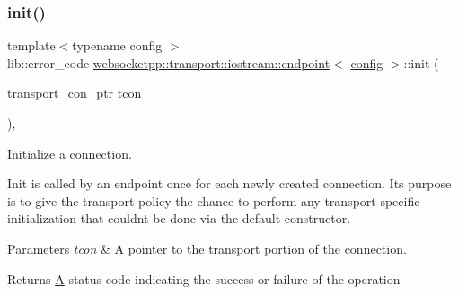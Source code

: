 \subsubsection{\texorpdfstring{init()}{init()}}
{\footnotesize\ttfamily template$<$typename config $>$ \\
lib\+::error\+\_\+code \mbox{\hyperlink{classwebsocketpp_1_1transport_1_1iostream_1_1endpoint}{websocketpp\+::transport\+::iostream\+::endpoint}}$<$ \mbox{\hyperlink{classconfig}{config}} $>$\+::init (\begin{DoxyParamCaption}\item[{\mbox{\hyperlink{classwebsocketpp_1_1transport_1_1iostream_1_1endpoint_a709bba4a4e1e2b7829abe4aa55de8078}{transport\+\_\+con\+\_\+ptr}}}]{tcon }\end{DoxyParamCaption})\hspace{0.3cm}{\ttfamily [inline]}, {\ttfamily [protected]}}



Initialize a connection. 

Init is called by an endpoint once for each newly created connection. It\textquotesingle{}s purpose is to give the transport policy the chance to perform any transport specific initialization that couldn\textquotesingle{}t be done via the default constructor.


\begin{DoxyParams}{Parameters}
{\em tcon} & \mbox{\hyperlink{struct_a}{A}} pointer to the transport portion of the connection. \\
\hline
\end{DoxyParams}
\begin{DoxyReturn}{Returns}
\mbox{\hyperlink{struct_a}{A}} status code indicating the success or failure of the operation 
\end{DoxyReturn}
\mbox{\label{classwebsocketpp_1_1transport_1_1iostream_1_1endpoint_a0c3fbf85313521d6d3a9a53faa2084ae}} 
